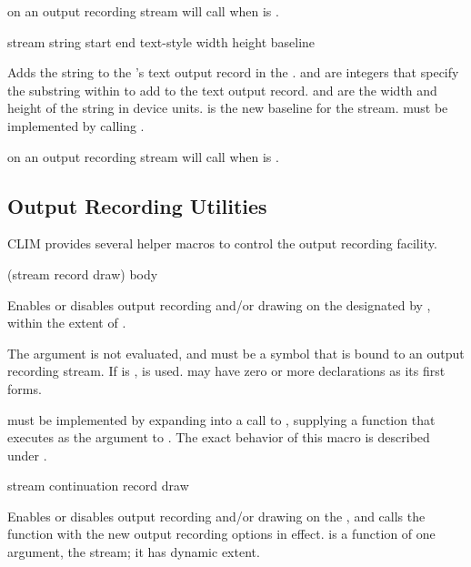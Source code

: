  on an output recording stream will call
 when  is .

 {stream string start end text-style
                                        width height baseline}

Adds the string  to the 
's text output record in the  .
 and  are integers that specify the substring within
 to add to the text output record.   and  are
the width and height of the string in device units.   is the new
baseline for the stream.   must be implemented by
calling .

 on an output recording stream will call
 when  is .


\subsection {Output Recording Utilities}

CLIM provides several helper macros to control the output recording facility.

 {(stream \key record draw) \body body} 

Enables or disables output recording and/or drawing on the  designated by , within the extent of .

The  argument is not evaluated, and must be a symbol that is bound to
an output recording stream.  If  is ,  is
used.  may have zero or more declarations as its first forms.

 must be implemented by expanding into a call
to , supplying a function that executes
 as the  argument to
.  The exact behavior of this macro is
described under .

 {stream continuation record draw}

Enables or disables output recording and/or drawing on the  , and calls the function  with
the new output recording options in effect.   is a function
of one argument, the stream; it has dynamic extent.

